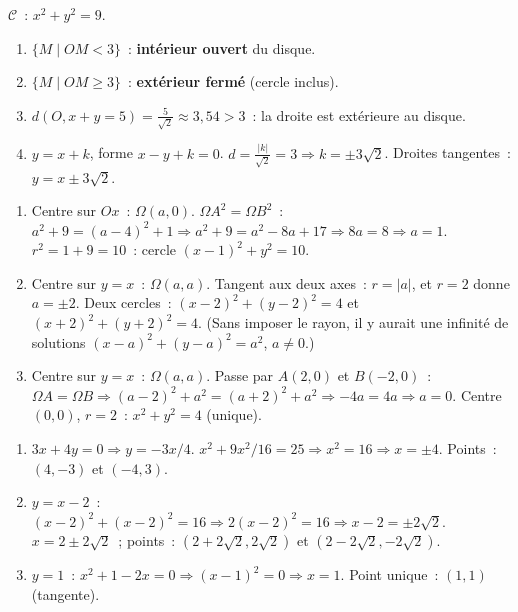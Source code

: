 
$\mathcal{C}$~: $x^2+y^2=9$.
\begin{enumerate}
  \item $\{M\mid OM<3\}$~: \textbf{int\'erieur ouvert} du disque.
  \item $\{M\mid OM\geq3\}$~: \textbf{ext\'erieur ferm\'e} (cercle inclus).
  \item $d(O, x+y=5)=\frac{5}{\sqrt{2}}\approx3{,}54>3$~: la droite est ext\'erieure au disque.
  \item $y=x+k$, forme $x-y+k=0$. $d=\frac{|k|}{\sqrt{2}}=3\Rightarrow k=\pm3\sqrt{2}$.
        Droites tangentes~: $y=x\pm3\sqrt{2}$.
\end{enumerate}


\begin{enumerate}
  \item Centre sur $Ox$~: $\Omega(a,0)$. $\Omega A^2=\Omega B^2$~:
        $a^2+9=(a-4)^2+1\Rightarrow a^2+9=a^2-8a+17\Rightarrow8a=8\Rightarrow a=1$.
        $r^2=1+9=10$~: cercle $(x-1)^2+y^2=10$.
  \item Centre sur $y=x$~: $\Omega(a,a)$. Tangent aux deux axes~: $r=|a|$, et $r=2$ donne $a=\pm2$.
        Deux cercles~: $(x-2)^2+(y-2)^2=4$ et $(x+2)^2+(y+2)^2=4$.
        (Sans imposer le rayon, il y aurait une infinit\'e de solutions $(x-a)^2+(y-a)^2=a^2$, $a\ne0$.)
  \item Centre sur $y=x$~: $\Omega(a,a)$. Passe par $A(2,0)$ et $B(-2,0)$~:
        $\Omega A=\Omega B\Rightarrow(a-2)^2+a^2=(a+2)^2+a^2\Rightarrow-4a=4a\Rightarrow a=0$.
        Centre $(0,0)$, $r=2$~: $x^2+y^2=4$ (unique).
\end{enumerate}


\begin{enumerate}
  \item $3x+4y=0\Rightarrow y=-3x/4$. $x^2+9x^2/16=25\Rightarrow x^2=16\Rightarrow x=\pm4$.
        Points~: $(4,-3)$ et $(-4,3)$.
  \item $y=x-2$~: $(x-2)^2+(x-2)^2=16\Rightarrow2(x-2)^2=16\Rightarrow x-2=\pm2\sqrt{2}$.
        $x=2\pm2\sqrt{2}$~; points~: $(2+2\sqrt{2},2\sqrt{2})$ et $(2-2\sqrt{2},-2\sqrt{2})$.
  \item $y=1$~: $x^2+1-2x=0\Rightarrow(x-1)^2=0\Rightarrow x=1$.
        Point unique~: $(1,1)$ (tangente).
\end{enumerate}

